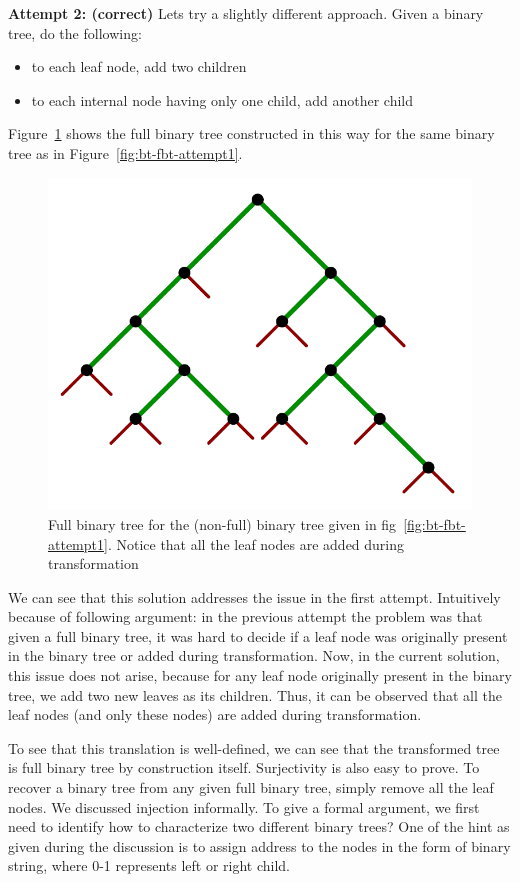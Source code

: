 \noindent\textbf{Attempt 2: (correct)}
Lets try a slightly different approach. Given a binary tree, do the following:
\begin{itemize}
    \item to each leaf node, add two children
    \item to each internal node having only one child, add another child
\end{itemize}
Figure~\ref{fig:binary-to-full-solution} shows the full binary tree constructed in this way for the same binary tree as in Figure~\ref{fig:bt-fbt-attempt1}.
\begin{figure}[h!]
    \centering
    \includegraphics[width=0.5\linewidth]{images/full-binary-3.png}
    \caption{Full binary tree for the (non-full) binary tree given in fig~\ref{fig:bt-fbt-attempt1}. Notice that all the leaf nodes are added during transformation}
    \label{fig:binary-to-full-solution}
\end{figure}
We can see that this solution addresses the issue in the first attempt. Intuitively because of following argument: in the previous attempt the problem was that given a full binary tree, it was hard to decide if a leaf node was originally present in the binary tree or added during transformation. Now, in the current solution, this issue does not arise, because for any leaf node originally present in the binary tree, we add two new leaves as its children. Thus, it can be observed that all the leaf nodes (and only these nodes) are added during transformation.

To see that this translation is well-defined, we can see that the transformed tree is full binary tree by construction itself. Surjectivity is also easy to prove. To recover a binary tree from any given full binary tree, simply remove all the leaf nodes. We discussed injection informally. To give a formal argument, we first need to identify how to characterize two different binary trees? One of the hint as given during the discussion is to assign address to the nodes in the form of binary string, where 0-1 represents left or right child. 

